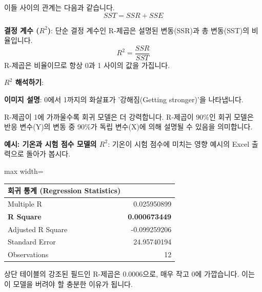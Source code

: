 \documentclass[11pt,a4paper]{book}
\theoremstyle{definition}
\begin{document}
\begin{tcolorbox}[infobox, title={모델의 유의성 평가 (Assessing Significance of Model)}]
이들 사이의 관계는 다음과 같습니다.
\begin{equation*}
SST = SSR + SSE
\end{equation*}

\textbf{결정 계수 ($R^2$)}:
단순 결정 계수인 R-제곱은 설명된 변동(SSR)과 총 변동(SST)의 비율입니다.
\begin{equation*}
R^2 = \frac{SSR}{SST}
\end{equation*}
R-제곱은 비율이므로 항상 0과 1 사이의 값을 가집니다.

\textbf{$R^2$ 해석하기}:
\begin{center}
\end{center}
\textbf{이미지 설명}: 0에서 1까지의 화살표가 '강해짐(Getting stronger)'을 나타냅니다.

R-제곱이 1에 가까울수록 회귀 모델은 더 강력합니다. R-제곱이 90\%인 회귀 모델은 반응 변수(Y)의 변동 중 90\%가 독립 변수(X)에 의해 설명될 수 있음을 의미합니다.

\textbf{예시: 기온과 시험 점수 모델의 $R^2$}:
기온이 시험 점수에 미치는 영향 예시의 Excel 출력으로 돌아가 봅시다.
\begin{adjustbox}{max width=\textwidth}
\begin{tabular}{lr}
\toprule
\textbf{회귀 통계 (Regression Statistics)} & \\
\midrule
Multiple R & 0.025950899 \\
\textbf{R Square} & \textbf{0.000673449} \\
Adjusted R Square & -0.099259206 \\
Standard Error & 24.95740194 \\
Observations & 12 \\
\bottomrule
\end{tabular}
\end{adjustbox}
상단 테이블의 강조된 필드인 R-제곱은 0.0006으로, 매우 작고 0에 가깝습니다. 이는 이 모델을 버려야 할 충분한 이유가 됩니다.


\end{tcolorbox}
\end{document}

